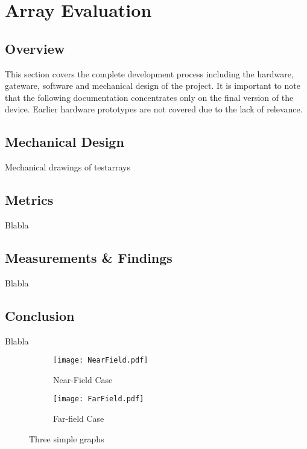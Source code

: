 \chapter{Array Evaluation}
\section{Overview}
This section covers the complete development process including the hardware, gateware, software and mechanical design of the project. It is important to note that the following documentation concentrates only on the final version of the device. Earlier hardware prototypes are not covered due to the lack of relevance.

\newpage
\section{Mechanical Design}
Mechanical drawings of testarrays

\newpage
\section{Metrics}
Blabla

\newpage
\section{Measurements \& Findings}
Blabla


\newpage
\section{Conclusion}
Blabla

\begin{figure}
	\centering
	\begin{subfigure}[b]{0.45\textwidth}
		\centering
		\texttt{[image: NearField.pdf]}
		\caption{Near-Field Case}
		\label{fig:y equals x}
	\end{subfigure}
	\hfill
	\begin{subfigure}[b]{0.45\textwidth}
		\centering
		\texttt{[image: FarField.pdf]}
		\caption{Far-field Case}
		\label{fig:three sin x}
	\end{subfigure}
	\caption{Three simple graphs}
	\label{fig:three graphs}
\end{figure}


